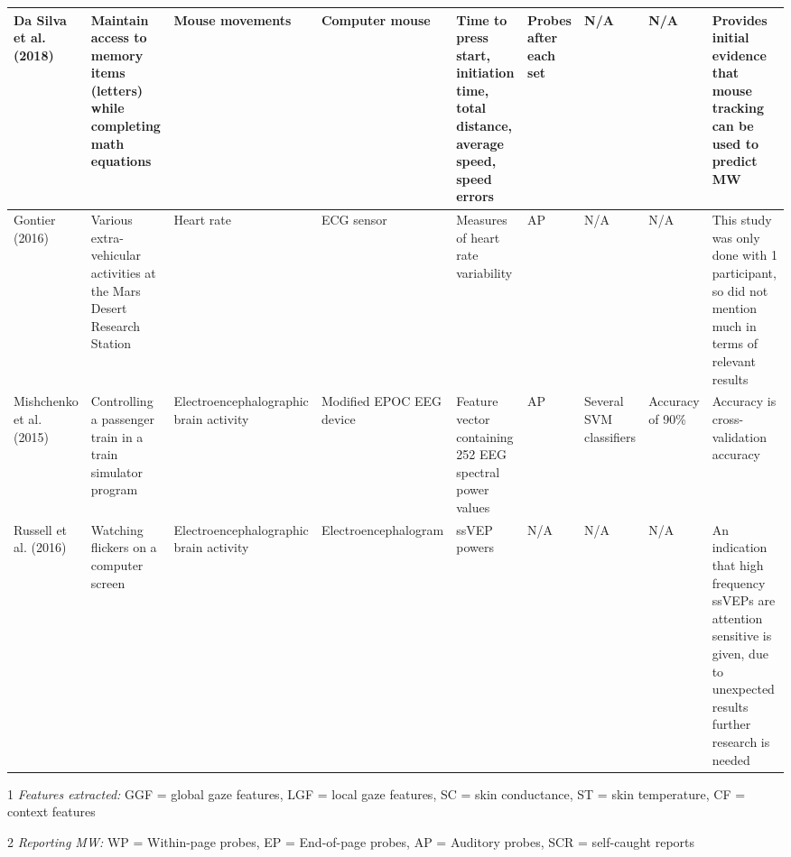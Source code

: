 \begin{ThreePartTable}
\begin{xtabular}{P{20mm}P{28mm}P{26mm}P{30mm}P{29mm}P{23mm}P{33mm}P{24mm}P{46mm}}
                Da Silva et al. (2018) \cite{DaSilva2018WanderingWandering} & Maintain access to memory items (letters) while completing math equations & Mouse movements & Computer mouse & Time to press start, initiation time, total distance, average speed, speed errors & Probes after each set & N/A & N/A & Provides initial evidence that mouse tracking can be used to predict MW\\ \midrule
                Gontier (2016) \cite{Gontier2016HowEnvironment} & Various extra-vehicular activities at the Mars Desert Research Station & Heart rate & ECG sensor & Measures of heart rate variability & AP & N/A & N/A & This study was only done with 1 participant, so did not mention much in terms of relevant results \\ \midrule
                Mishchenko et al. (2015) \cite{Mishchenko2015DetectingTespiti} & Controlling a passenger train in a train simulator program & Electroencephalo\-graphic brain activity & Modified EPOC EEG device & Feature vector containing 252 EEG spectral power values & AP & Several SVM classifiers & Accuracy of 90\% & Accuracy is cross-validation accuracy \\ \midrule
                Russell et al. (2016) \cite{Russell2016MonitoringEnvironments} & Watching flickers on a computer screen & Electroencephalo\-graphic brain activity & Electroencephalo\-gram & ssVEP powers & N/A & N/A & N/A & An indication that high frequency ssVEPs are attention sensitive is given, due to unexpected results further research is needed\\ \midrule
                \bottomrule
        \end{xtabular}
        \begin{tablenotes}
                \small
                \item[1] \emph{Features extracted:} GGF = global gaze features, LGF = local gaze features, SC = skin conductance, ST = skin temperature, CF = context features
                \item[2] \emph{Reporting MW:} WP = Within-page probes, EP = End-of-page probes, AP = Auditory probes, SCR = self-caught reports
        \end{tablenotes}
\end{ThreePartTable}
\restoregeometry %
\twocolumn       %